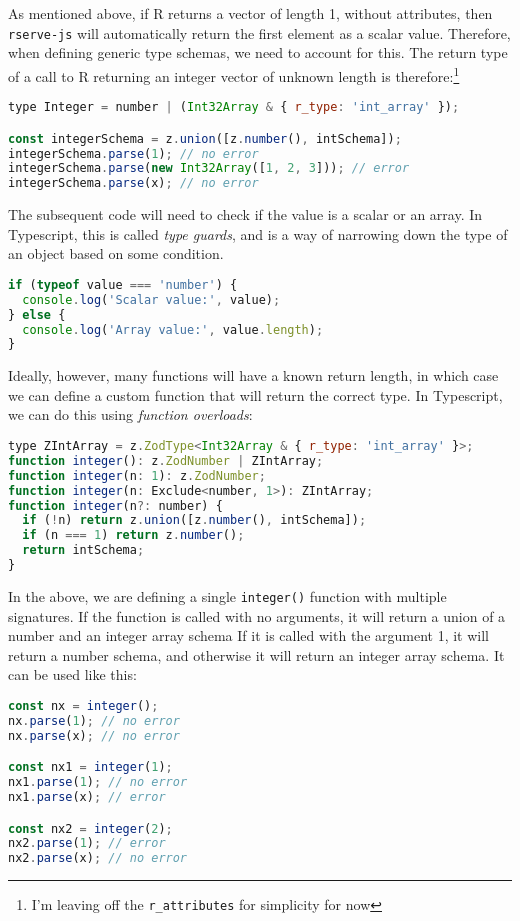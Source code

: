 \documentclass{article}
\newcommand{\pkg}[1]{\texttt{#1}}
\newcommand{\cmd}[1]{\texttt{#1}}
\newcommand{\prog}[1]{{\sf #1}}
\newcommand{\R}{\prog{R}}
\begin{document}
As mentioned above, if \R{} returns a vector of length 1, without attributes, then \pkg{rserve-js} will automatically return the first element as a scalar value.
Therefore, when defining generic type schemas, we need to account for this.
The return type of a call to R returning an integer vector of unknown length is therefore:\footnote{I'm leaving off the \cmd{r\_attributes} for simplicity for now}
\begin{lstlisting}[language=Javascript,numbers=none]
type Integer = number | (Int32Array & { r_type: 'int_array' });

const integerSchema = z.union([z.number(), intSchema]);
integerSchema.parse(1); // no error
integerSchema.parse(new Int32Array([1, 2, 3])); // error
integerSchema.parse(x); // no error
\end{lstlisting}

The subsequent code will need to check if the value is a scalar or an array.
In Typescript, this is called \emph{type guards}, and is a way of narrowing down the type of an object based on some condition.
\begin{lstlisting}[language=Javascript,numbers=none]
if (typeof value === 'number') {
  console.log('Scalar value:', value);
} else {
  console.log('Array value:', value.length);
}
\end{lstlisting}
Ideally, however, many functions will have a known return length, in which case we can define a custom function that will return the correct type.
In Typescript, we can do this using \emph{function overloads}:
\begin{lstlisting}[language=Javascript,numbers=none]
type ZIntArray = z.ZodType<Int32Array & { r_type: 'int_array' }>;
function integer(): z.ZodNumber | ZIntArray;
function integer(n: 1): z.ZodNumber;
function integer(n: Exclude<number, 1>): ZIntArray;
function integer(n?: number) {
  if (!n) return z.union([z.number(), intSchema]);
  if (n === 1) return z.number();
  return intSchema;
}
\end{lstlisting}
In the above, we are defining a single \cmd{integer()} function with multiple signatures.
If the function is called with no arguments, it will return a union of a number and an integer array schema
If it is called with the argument 1, it will return a number schema, and otherwise it will return an integer array schema.
It can be used like this:
\begin{lstlisting}[language=Javascript,numbers=none]
const nx = integer();
nx.parse(1); // no error
nx.parse(x); // no error

const nx1 = integer(1);
nx1.parse(1); // no error
nx1.parse(x); // error

const nx2 = integer(2);
nx2.parse(1); // error
nx2.parse(x); // no error
\end{lstlisting}
\end{document}
